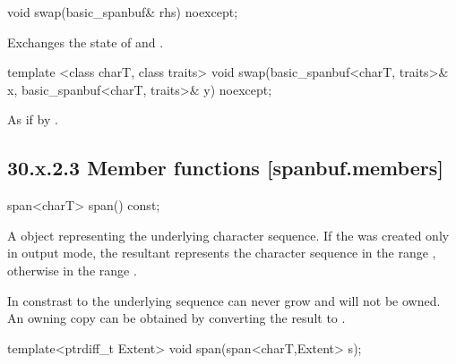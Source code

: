 \documentclass[ebook,11pt,article]{memoir}
\begin{document}
\begin{itemdecl}
void swap(basic_spanbuf& rhs) noexcept;
\end{itemdecl}

\begin{itemdescr}
\pnum
\effects Exchanges the state of 
and .
\end{itemdescr}

\begin{itemdecl}
template <class charT, class traits>
  void swap(basic_spanbuf<charT, traits>& x,
            basic_spanbuf<charT, traits>& y) noexcept;
\end{itemdecl}

\begin{itemdescr}
\pnum
\effects As if by .
\end{itemdescr}


\subsection{30.x.2.3 Member functions [spanbuf.members]}

\begin{itemdecl}
span<charT> span() const;
\end{itemdecl}

\begin{itemdescr}
\pnum
\returns
A
object representing the  
underlying character sequence.
If the  was created only in output mode, the resultant
 represents the character sequence in the range
, otherwise in the range
. 
\begin{note}
In constrast to  the underlying sequence can never grow and will not be owned. An owning copy can be obtained by converting the result to .
\end{note}


\end{itemdescr}

\begin{itemdecl}
template<ptrdiff_t Extent>
void span(span<charT,Extent> s);
\end{itemdecl}
\end{document}
